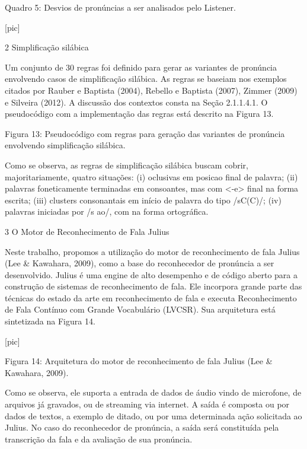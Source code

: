    Quadro 5: Desvios de pron\'uncias a ser analisados pelo Listener.

                                [pic]

2 Simplifica\c{c}\~ao sil\'abica

Um conjunto de 30 regras foi definido para gerar as variantes de
pron\'uncia envolvendo casos de simplifica\c{c}\~ao sil\'abica. As regras se
baseiam nos exemplos citados por Rauber e Baptista (2004), Rebello e
Baptista (2007), Zimmer (2009) e Silveira (2012). A discuss\~ao dos
contextos consta na Se\c{c}\~ao 2.1.1.4.1. O pseudoc\'odigo com a implementa\c{c}\~ao
das regras est\'a descrito na Figura 13.

Figura 13: Pseudoc\'odigo com regras para gera\c{c}\~ao das variantes de
pron\'uncia envolvendo simplifica\c{c}\~ao sil\'abica.

Como se observa, as regras de simplifica\c{c}\~ao sil\'abica buscam cobrir,
majoritariamente, quatro situa\c{c}\~oes: (i) oclusivas em posicao final de
palavra; (ii) palavras foneticamente terminadas em consoantes, mas com
\textless{}-e\textgreater{} final na forma escrita; (iii) clusters
consonantais em in\'icio de palavra do tipo /sC(C)/; (iv) palavras
iniciadas por /s ao/, com na forma ortogr\'afica.

3 O Motor de Reconhecimento de Fala Julius

Neste trabalho, propomos a utiliza\c{c}\~ao do motor de reconhecimento de fala
Julius (Lee \& Kawahara, 2009), como a base do reconhecedor de pron\'uncia
a ser desenvolvido. Julius \'e uma engine de alto desempenho e de c\'odigo
aberto para a constru\c{c}\~ao de sistemas de reconhecimento de fala. Ele
incorpora grande parte das t\'ecnicas do estado da arte em reconhecimento
de fala e executa Reconhecimento de Fala Cont\'inuo com Grande Vocabul\'ario
(LVCSR). Sua arquitetura est\'a sintetizada na Figura 14.

                                [pic]

Figura 14: Arquitetura do motor de reconhecimento de fala Julius (Lee \&
Kawahara, 2009).

Como se observa, ele suporta a entrada de dados de \'audio vindo de
microfone, de arquivos j\'a gravados, ou de streaming via internet. A
sa\'ida \'e composta ou por dados de textos, a exemplo de ditado, ou por uma
determinada a\c{c}\~ao solicitada ao Julius. No caso do reconhecedor de
pron\'uncia, a sa\'ida ser\'a constitu\'ida pela transcri\c{c}\~ao da fala e da
avalia\c{c}\~ao de sua pron\'uncia.

